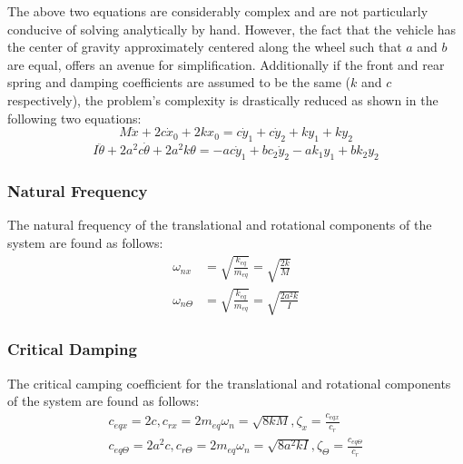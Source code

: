 \documentclass[12pt]{article}
\begin{document}
The above two equations are considerably complex and are not particularly conducive of solving analytically by hand. However, the fact that the vehicle has the center of gravity approximately centered along the wheel such that $a$ and $b$ are equal, offers an avenue for simplification. Additionally if the front and rear spring and damping coefficients are assumed to be the same ($k$ and $c$ respectively), the problem's complexity is drastically reduced as shown in the following two equations: 
\begin{equation}
	M \ddot x + 2c\dot x_0 + 2kx_0 = c\dot y_1 + c\dot y_2 + ky_1 + ky_2
\end{equation}
\begin{equation}
	I \ddot\theta + 2a^2c\dot\theta + 2a^2k\theta = -ac\dot y_1 + bc_2\dot y_2 - ak_1y_1 + bk_2y_2
\end{equation}

\subsubsection{Natural Frequency}
The natural frequency of the translational and rotational components of the system are found as follows: 
\begin{equation}
	\begin{split}
	\omega _{nx} &= \sqrt{\frac{k_{eq}}{m_{eq}}} = \sqrt{\frac{2k}{M}}\\
	\omega _{n\Theta} &= \sqrt{\frac{k_{eq}}{m_{eq}}}= \sqrt{\frac{2a^2k}{I}}
	\end{split}  
\end{equation}

\subsubsection{Critical Damping}
The critical camping coefficient for the translational and rotational components of the system are found as follows:
\begin{equation}
	\begin{split}
	c_{eqx} = 2c, c_{rx} = 2m_{eq}\omega _n = \sqrt{8kM}, \zeta _x = \frac{c_{eqx}}{c_r}\\
	c_{eq\Theta} = 2a^2c, c_{r\Theta} = 2m_{eq}\omega _n = \sqrt{8a^2kI}, \zeta _\Theta = \frac{c_{eq\Theta}}{c_r}
	\end{split}  
\end{equation}
\end{document}
